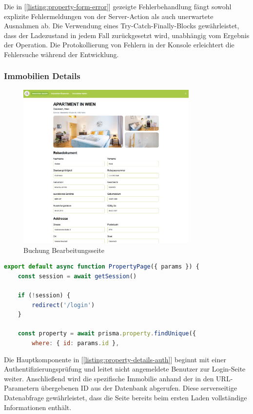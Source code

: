 					
					Die in [\ref{listing:property-form-error}] gezeigte Fehlerbehandlung fängt sowohl explizite Fehlermeldungen von der Server-Action als auch unerwartete Ausnahmen ab. Die Verwendung eines Try-Catch-Finally-Blocks gewährleistet, dass der Ladezustand in jedem Fall zurückgesetzt wird, unabhängig vom Ergebnis der Operation. Die Protokollierung von Fehlern in der Konsole erleichtert die Fehlersuche während der Entwicklung.
					
					
					
					\subsubsection{Immobilien Details}
					
					\begin{figure}
						\centering
						\includegraphics[width=0.80\textwidth]{images/Immobilien_bearbeiten.png}
						\caption{Buchung Bearbeitungsseite}
					\end{figure}
\begin{lstlisting}[language=JavaScript, caption={Authentifizierung und Datenabruf.}, label={listing:property-details-auth}]
export default async function PropertyPage({ params }) {
	const session = await getSession()

	if (!session) {
		redirect('/login')
	}

	const property = await prisma.property.findUnique({
		where: { id: params.id },
\end{lstlisting}

							
							Die Hauptkomponente in [\ref{listing:property-details-auth}] beginnt mit einer Authentifizierungsprüfung und leitet nicht angemeldete Benutzer zur Login-Seite weiter. Anschließend wird die spezifische Immobilie anhand der in den URL-Parametern übergebenen ID aus der Datenbank abgerufen. Diese serverseitige Datenabfrage gewährleistet, dass die Seite bereits beim ersten Laden vollständige Informationen enthält.
							
